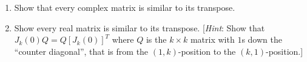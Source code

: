 \begin{multicols}{2}
\columnbreak
\begin{ex}
\begin{enumerate}[label={\alph*.}]
\item Show that every complex matrix is similar to its transpose.

\item Show every real matrix is similar to its transpose. [\textit{Hint}: Show that $J_{k}(0)Q = Q[J_{k}(0)]^{T}$ where $Q$ is the $k \times k$ matrix with $1$s down the ``counter diagonal'', that is from the $(1, k)$-position to the $(k, 1)$-position.]

\end{enumerate}
\end{ex}
\end{multicols}
